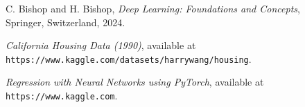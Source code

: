 \documentclass[letterpaper,12pt]{article}
\begin{document}
\begin{thebibliography}{99}

C. Bishop and H. Bishop, \textit{Deep Learning: Foundations and Concepts},\\
Springer, Switzerland, 2024.

 \emph{California Housing Data (1990)},  available at\\
\texttt{https://www.kaggle.com/datasets/harrywang/housing}.

 \emph{Regression with Neural Networks using PyTorch},  available at\\
\texttt{https://www.kaggle.com}.


\end{thebibliography}
\end{document}

